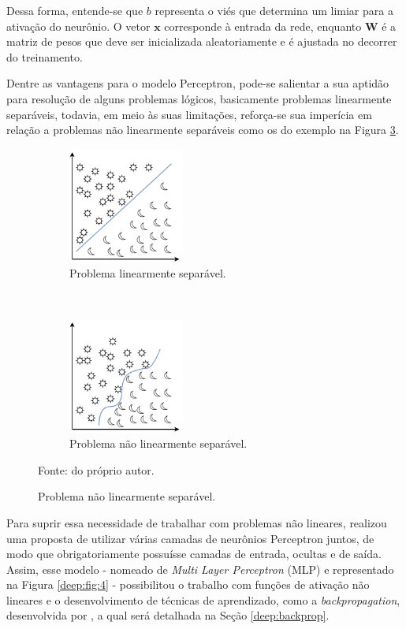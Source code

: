 Dessa forma, entende-se que $b$ representa o viés que determina um limiar para a ativação do neurônio. O vetor $\textbf{x}$ corresponde à entrada da rede, enquanto $\textbf{W}$ é a matriz de pesos que deve ser inicializada aleatoriamente e é ajustada no decorrer do treinamento.

Dentre as vantagens para o modelo Perceptron, pode-se salientar a sua aptidão para resolução de alguns problemas lógicos, basicamente problemas linearmente separáveis, todavia, em meio às suas limitações, reforça-se sua imperícia em relação a problemas não linearmente separáveis como os do exemplo na Figura \ref{deep:fig:3.2}.

\begin{figure}[H]
   \caption{Representação de problemas linearmente e não linearmente separáveis.}
   \centering
   \label{deep:fig:3}
    \begin{subfigure}[t]{0.45\textwidth}
        \centering
        \includegraphics[height=1.5in]{recursos/imagens/deep/l_separavel.png}
        \caption{Problema linearmente separável.}
        \label{deep:fig:3.1}
    \end{subfigure}%
    ~ 
    \begin{subfigure}[t]{0.45\textwidth}
        \centering
        \includegraphics[height=1.5in]{recursos/imagens/deep/nl_separavel.png}
        \caption{Problema não linearmente separável.}
        \label{deep:fig:3.2}
    \end{subfigure}%

    Fonte: do próprio autor.
\end{figure}

Para suprir essa necessidade de trabalhar com problemas não lineares, \cite{Werbos:74} realizou uma proposta de utilizar várias camadas de neurônios Perceptron juntos, de modo que obrigatoriamente possuísse camadas de entrada, ocultas e de saída. Assim, esse modelo - nomeado de \textit{Multi Layer Perceptron} (MLP) \citep{Werbos:74} e representado na Figura \ref{deep:fig:4} - possibilitou o trabalho com funções de ativação não lineares e o desenvolvimento de técnicas de aprendizado, como a \textit{backpropagation}, desenvolvida por \cite{rumelhart1986learning}, a qual será detalhada na Seção \ref{deep:backprop}.

